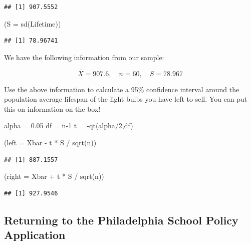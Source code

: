 \documentclass[
]{book}
\newenvironment{Shaded}{\begin{snugshade}}{\end{snugshade}}
\newcommand{\AttributeTok}[1]{\textcolor[rgb]{0.77,0.63,0.00}{#1}}
\newcommand{\DecValTok}[1]{\textcolor[rgb]{0.00,0.00,0.81}{#1}}
\newcommand{\FloatTok}[1]{\textcolor[rgb]{0.00,0.00,0.81}{#1}}
\newcommand{\FunctionTok}[1]{\textcolor[rgb]{0.00,0.00,0.00}{#1}}
\newcommand{\NormalTok}[1]{#1}
\newcommand{\OtherTok}[1]{\textcolor[rgb]{0.56,0.35,0.01}{#1}}
\newcommand{\SpecialCharTok}[1]{\textcolor[rgb]{0.00,0.00,0.00}{#1}}
\begin{document}
\begin{verbatim}
## [1] 907.5552
\end{verbatim}

\begin{Shaded}
\begin{Highlighting}[]
\NormalTok{(}\AttributeTok{S =} \FunctionTok{sd}\NormalTok{(Lifetime))}
\end{Highlighting}
\end{Shaded}

\begin{verbatim}
## [1] 78.96741
\end{verbatim}

We have the following information from our sample:

\[\bar{X}=907.6, \quad n = 60, \quad S = 78.967\]

Use the above information to calculate a 95\% confidence interval around the population average lifespan of the light bulbs you have left to sell. You can put this on information on the box!

\begin{Shaded}
\begin{Highlighting}[]
\NormalTok{alpha }\OtherTok{=} \FloatTok{0.05}
\NormalTok{df }\OtherTok{=}\NormalTok{ n}\DecValTok{{-}1}
\NormalTok{t }\OtherTok{=} \SpecialCharTok{{-}}\FunctionTok{qt}\NormalTok{(alpha}\SpecialCharTok{/}\DecValTok{2}\NormalTok{,df)}

\NormalTok{(}\AttributeTok{left =}\NormalTok{ Xbar }\SpecialCharTok{{-}}\NormalTok{ t }\SpecialCharTok{*}\NormalTok{ S }\SpecialCharTok{/} \FunctionTok{sqrt}\NormalTok{(n))}
\end{Highlighting}
\end{Shaded}

\begin{verbatim}
## [1] 887.1557
\end{verbatim}

\begin{Shaded}
\begin{Highlighting}[]
\NormalTok{(}\AttributeTok{right =}\NormalTok{ Xbar }\SpecialCharTok{+}\NormalTok{ t }\SpecialCharTok{*}\NormalTok{ S }\SpecialCharTok{/} \FunctionTok{sqrt}\NormalTok{(n))}
\end{Highlighting}
\end{Shaded}

\begin{verbatim}
## [1] 927.9546
\end{verbatim}

\hypertarget{returning-to-the-philadelphia-school-policy-application}{%
\subsection{Returning to the Philadelphia School Policy Application}\label{returning-to-the-philadelphia-school-policy-application}}
\end{document}
